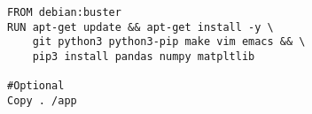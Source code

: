 
\begin{lstlisting}[language=docker, frame=single, caption={Python DevContainer Dockerfile},label=code::docker_dev_example]
FROM debian:buster
RUN apt-get update && apt-get install -y \
    git python3 python3-pip make vim emacs && \
    pip3 install pandas numpy matpltlib

#Optional
Copy . /app
\end{lstlisting}
